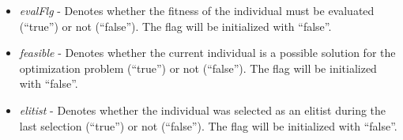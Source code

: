 \begin{itemize}

\item {\em evalFlg} -
Denotes whether the fitness of the individual must be
evaluated (``true'') or not (``false'').
The flag will be initialized with ``false''.

\item {\em feasible} -
Denotes whether the current individual is a possible
solution for the optimization problem (``true'') or
not (``false''). The flag will be initialized with ``false''.

\item {\em elitist} -
Denotes whether the individual was selected as an elitist
during the last selection (``true'') or not (``false'').
The flag will be initialized with ``false''.
\end{itemize}
